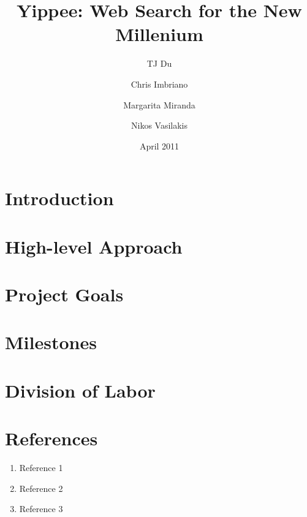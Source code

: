 \documentclass[11pt, twocolumn]{article}
\begin{document}
\title{Yippee: Web Search for the New Millenium}
\author{TJ Du 
	\and Chris Imbriano
	\and Margarita Miranda
	\and Nikos Vasilakis}
\date{April 2011}

\maketitle

\section{ Introduction }
\section{ High-level Approach }
\section{ Project Goals }
\section{ Milestones }
\section{ Division of Labor }




\section{References}
\begin{enumerate}
\item Reference 1
\item Reference 2
\item Reference 3
\end{enumerate}
	
 
\end{document}
